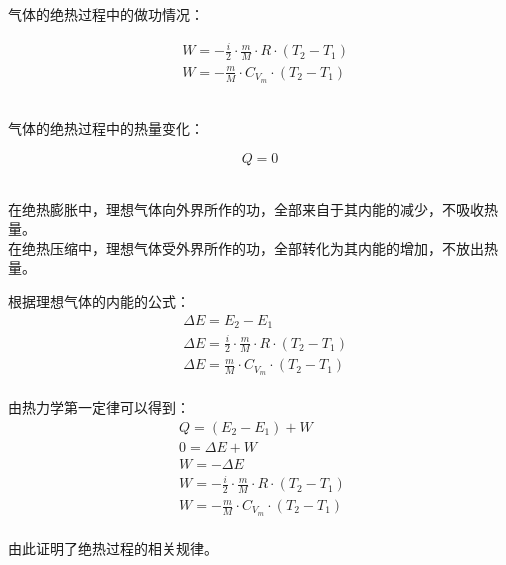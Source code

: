 \documentclass[UTF8]{ctexart}
\begin{document}
    气体的绝热过程中的做功情况：
    \begin{large}
        \begin{align*}
            &W=-\frac{i}{2}\cdot\frac{m}{M}\cdot R\cdot(T_2-T_1)\\[3mm]
            &W=-\frac{m}{M}\cdot C_{V_m}\cdot(T_2-T_1)
        \end{align*}
    \end{large}\\
    气体的绝热过程中的热量变化：
    \begin{large}
        \begin{equation*}
            Q=0
        \end{equation*}
    \end{large}\\
    在绝热膨胀中，理想气体向外界所作的功，全部来自于其内能的减少，不吸收热量。\\[3mm]
    在绝热压缩中，理想气体受外界所作的功，全部转化为其内能的增加，不放出热量。\\[3mm]

\newpage

    根据理想气体的内能的公式：
    \begin{align}
        &\Delta E=E_2-E_1\\[3mm]
        &\Delta E=\frac{i}{2}\cdot\frac{m}{M}\cdot R\cdot (T_2-T_1)\\[3mm]
        &\Delta E=\frac{m}{M}\cdot C_{V_m}\cdot(T_2-T_1)
    \end{align}\\
    由热力学第一定律可以得到：
    \begin{align}
        &Q=(E_2-E_1)+W\\[3mm]
        &0=\Delta E+W\\[3mm]
        &W=-\Delta E\\[3mm]
        &W=-\frac{i}{2}\cdot\frac{m}{M}\cdot R\cdot (T_2-T_1)~~\\[3mm]
        &W=-\frac{m}{M}\cdot C_{V_m}\cdot(T_2-T_1)
    \end{align}\\
    由此证明了绝热过程的相关规律。
\end{document}
